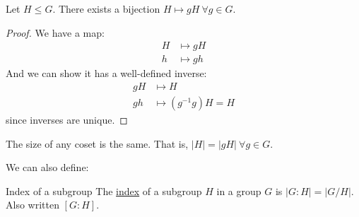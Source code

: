 \documentclass[../Main.tex]{subfiles}
\begin{document}
\begin{lemma}
    Let $H \leq G$. There exists a bijection $H \mapsto gH~\forall g \in G$.
    \label{lemCosetsBijection}
\end{lemma}
\begin{proof}
    We have a map:
    \begin{align*}
        H &\mapsto gH \\
        h &\mapsto gh
    \end{align*}
    And we can show it has a well-defined inverse:
    \begin{align*}
        gH &\mapsto H \\
        gh &\mapsto (g^{-1} g)H = H
    \end{align*}
    since inverses are unique.
\end{proof}
\begin{corollary}
    The size of any coset is the same. That is, $|H| = |gH|~\forall g \in G$.
    \label{corCosetsSameSize}
\end{corollary}
We can also define:
\begin{definition}{Index of a subgroup}
    The \underline{index} of a subgroup $H$ in a group $G$ is $|G : H| = |G / H|$. Also written $\left[G : H\right]$.
\end{definition}
\end{document}
